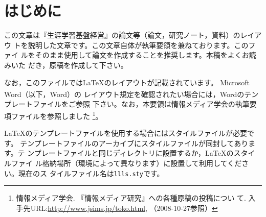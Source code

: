 \documentclass[b5paper,10pt,twocolumn,tombow]{jarticle}
\begin{document}


\tableofcontents{}
\bigskip{}

\section{はじめに}
この文章は『生涯学習基盤経営』の論文等（論文，研究ノート，資料）のレイアウ
トを説明した文章です。この文章自体が執筆要領を兼ねております。このファイ
ルをそのまま使用して論文を作成することを推奨します。本稿をよくお読みいた
だき，原稿を作成して下さい。


なお，このファイルでは\LaTeX{}のレイアウトが記載されています。
Microsoft Word\textsuperscript{\textregistered}（以下，Word）の
レイアウト規定を確認されたい場合には，Wordのテンプレートファイルをご参照
下さい。なお，本要領は情報メディア学会の執筆要項ファイルを参照しました
\footnote{情報メディア学会. 『情報メディア研究』への各種原稿の投稿につい
て. 入手先URL:\url{http://www.jsims.jp/toko.html}, （2008-10-27参照）}。

\LaTeX{}のテンプレートファイルを使用する場合にはスタイルファイルが必要です。
テンプレートファイルのアーカイブにスタイルファイルが同封してあります。テ
ンプレートファイルと同じディレクトリに設置するか，\LaTeX{}のスタイルファイ
ル格納場所（環境によって異なります）に設置して利用してください。現在のス
タイルファイル名は\texttt{llls.sty}です。
\end{document}
